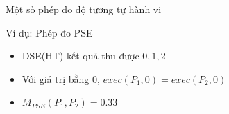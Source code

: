 \begin{frame}{Một số phép đo độ tương tự hành vi}
\begin{exampleblock}{Ví dụ: Phép đo PSE}
	\begin{minipage}[t]{0.3\linewidth}
	
	\end{minipage}%
	\hfill\vrule\hfill
	\begin{minipage}[t]{0.3\linewidth}
		
	\end{minipage}%
	\hfill\vrule\hfill
	\begin{minipage}[t]{0.3\linewidth}
	
\end{minipage}%
\end{exampleblock}
\begin{itemize}
	\item DSE(HT) kết quả thu được $ 0, 1, 2 $
	\item Với giá trị bằng $ 0 $, $exec(P_{1}, 0) = exec(P_{2}, 0)$
	\item $  M_{PSE}(P_{1}, P_{2}) = 0.33 $
\end{itemize}
\end{frame}